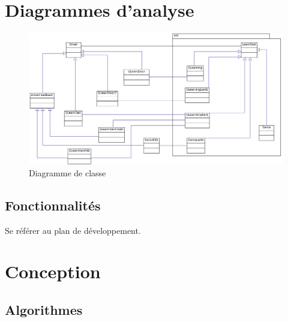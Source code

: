 \documentclass[a4paper,12pt]{article}
\begin{document}
  \begin{titlepage}
   \def\titletype{Analyse et conception}
   
  \end{titlepage}

  
  \clearpage

  \tableofcontents
  

  \clearpage
  
  \renewcommand{\labelitemi}{$\bullet$}
  \renewcommand{\labelitemii}{$\circ$}
  \renewcommand{\labelitemiii}{$\diamond$}
  \renewcommand{\labelitemiv}{$\ast$}
 
 \section{Diagrammes d’analyse}

    \begin{figure}[H]
      \begin{center}
	\includegraphics[width=450px]{Diagrammedeclasses}
	\caption{ Diagramme de classe }
	\end{center}
    \end{figure}
 
    \subsection{Fonctionnalités}
    Se référer au plan de développement.
  
  
  \section{Conception}
  
  \subsection{Algorithmes}
  
\end{document}
